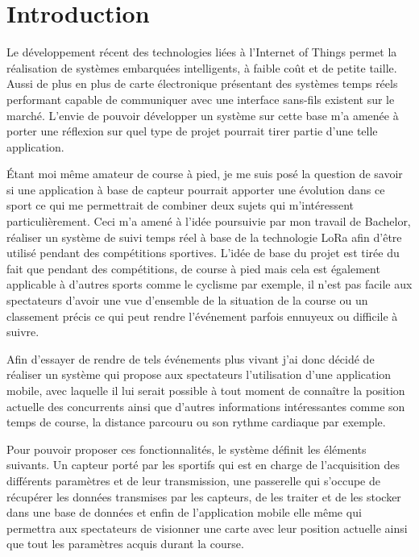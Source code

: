 \chapter{Introduction}

Le développement récent des technologies liées à l'Internet of Things permet la réalisation de systèmes embarquées intelligents, à faible coût et de petite taille. Aussi de plus en plus de carte électronique présentant des systèmes temps réels performant capable de communiquer avec une interface sans-fils existent sur le marché. L'envie de pouvoir développer un système sur cette base m'a amenée à porter une réflexion sur quel type de projet pourrait tirer partie d'une telle application. 

Étant moi même amateur de course à pied, je me suis posé la question de savoir si une application à base de capteur pourrait apporter une évolution dans ce sport ce qui me permettrait de combiner deux sujets qui m'intéressent particulièrement. Ceci m'a amené à l'idée poursuivie par mon travail de Bachelor, réaliser un système de suivi temps réel à base de la technologie LoRa afin d'être utilisé pendant des compétitions sportives. L'idée de base du projet est tirée du fait que pendant des compétitions, de course à pied mais cela est également applicable à d'autres sports comme le cyclisme par exemple, il n'est pas facile aux spectateurs d'avoir une vue d'ensemble de la situation de la course ou un classement précis ce qui peut rendre l'événement parfois ennuyeux ou difficile à suivre.

Afin d'essayer de rendre de tels événements plus vivant j'ai donc décidé de réaliser un système qui propose aux spectateurs l'utilisation d'une application mobile, avec laquelle il lui serait possible à tout moment de connaître la position actuelle des concurrents ainsi que d'autres informations intéressantes comme son temps de course, la distance parcouru ou son rythme cardiaque par exemple. 

Pour pouvoir proposer ces fonctionnalités, le système définit les éléments suivants. Un capteur porté par les sportifs qui est en charge de l'acquisition des différents paramètres et de leur transmission, une passerelle qui s'occupe de récupérer les données transmises par les capteurs, de les traiter et de les stocker dans une base de données et enfin de l'application mobile elle même qui permettra aux spectateurs de visionner une carte avec leur position actuelle ainsi que tout les paramètres acquis durant la course.